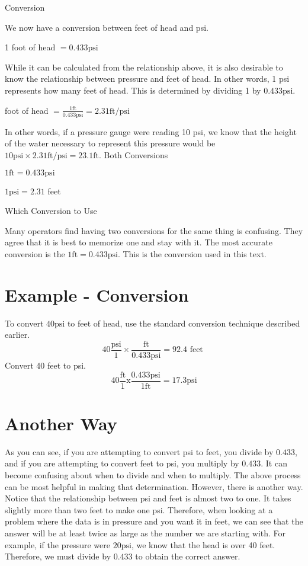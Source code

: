 Conversion

We now have a conversion between feet of head and psi.

1 foot of head $=0.433 \mathrm{psi}$

While it can be calculated from the relationship above, it is also desirable to know the relationship between pressure and feet of head. In other words, 1 psi represents how many feet of head. This is determined by dividing 1 by $0.433 \mathrm{psi}$.

foot of head $=\frac{1 \mathrm{ft}}{0.433 \mathrm{psi}}=2.31 \mathrm{ft} / \mathrm{psi}$

In other words, if a pressure gauge were reading 10 psi, we know that the height of the water necessary to represent this pressure would be $10 \mathrm{psi} \times 2.31 \mathrm{ft} / \mathrm{psi}=23.1 \mathrm{ft}$. Both Conversions

$1 \mathrm{ft}=0.433 \mathrm{psi}$

$1 \mathrm{psi}=2.31$ feet

Which Conversion to Use

Many operators find having two conversions for the same thing is confusing. They agree that it is best to memorize one and stay with it. The most accurate conversion is the $1 \mathrm{ft}=0.433 \mathrm{psi}$. This is the conversion used in this text.

\section{Example - Conversion}
To convert $40 \mathrm{psi}$ to feet of head, use the standard conversion technique described earlier.
$$
40 \frac{\mathrm{psi}}{1} \times \frac{\mathrm{ft}}{0.433 \mathrm{psi}}=92.4 \text { feet }
$$
Convert 40 feet to psi.
$$
40 \frac{\mathrm{ft}}{1} \mathrm{x} \frac{0.433 \mathrm{psi}}{1 \mathrm{ft}}=17.3 \mathrm{psi}
$$

\section{Another Way}
As you can see, if you are attempting to convert psi to feet, you divide by $0.433$, and if you are attempting to convert feet to psi, you multiply by $0.433$. It can become confusing about when to divide and when to multiply. The above process can be most helpful in making that determination. However, there is another way. Notice that the relationship between psi and feet is almost two to one. It takes slightly more than two feet to make one psi. Therefore, when looking at a problem where the data is in pressure and you want it in feet, we can see that the answer will be at least twice as large as the number we are starting with. For example, if the pressure were $20 \mathrm{psi}$, we know that the head is over 40 feet. Therefore, we must divide by $0.433$ to obtain the correct answer.


